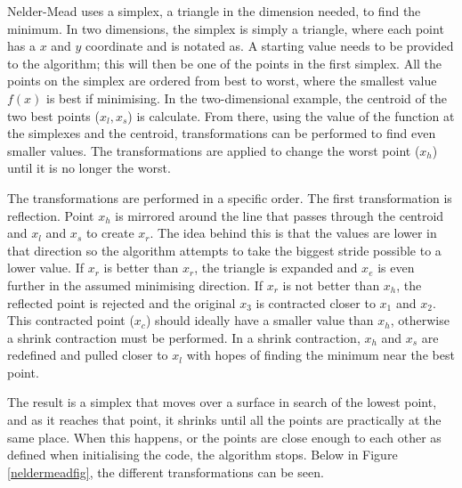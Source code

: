 Nelder-Mead uses a simplex, a triangle in the dimension needed, to find the minimum.
In two dimensions, the simplex is simply a triangle, where each point has a $x$ and $y$ coordinate and is notated as. 
A starting value needs to be provided to the algorithm; this will then be one of the points in the first simplex.
All the points on the simplex are ordered from best to worst, where the smallest value $f (x)$ is best if minimising.
In the two-dimensional example, the centroid of the two best points  ($x_l,x_s$) is calculate.
From there, using the value of the function at the simplexes and the centroid, transformations can be performed to find even smaller values.
The transformations are applied to change the worst point  ($x_h$) until it is no longer the worst.

The transformations are performed in a specific order.
The first transformation is reflection.
Point $x_h$ is mirrored around the line that passes through the centroid and $x_l$ and $x_s$ to create $x_r$.
The idea behind this is that the values are lower in that direction so the algorithm attempts to take the biggest stride possible to a lower value.
If $x_r$ is better than $x_r$,  the triangle is expanded and $x_e$ is even further in the assumed minimising direction.
If $x_r$ is not better than $x_h$, the reflected point is rejected and the original $x_3$ is contracted closer to $x_1$ and $x_2$.
This contracted point ($x_c$) should ideally have a smaller value than $x_h$, otherwise a shrink contraction must be performed.
In a shrink contraction, $x_h$ and $x_s$ are redefined and pulled closer to $x_l$ with hopes of finding the minimum near the best point.

The result is a simplex that moves over a surface in search of the lowest point, and as it reaches that point, it shrinks until all the points are practically at the same place. When this happens, or the points are close enough to each other as defined when initialising the code, the algorithm stops. Below in Figure \ref{neldermeadfig}, the different transformations can be seen.

